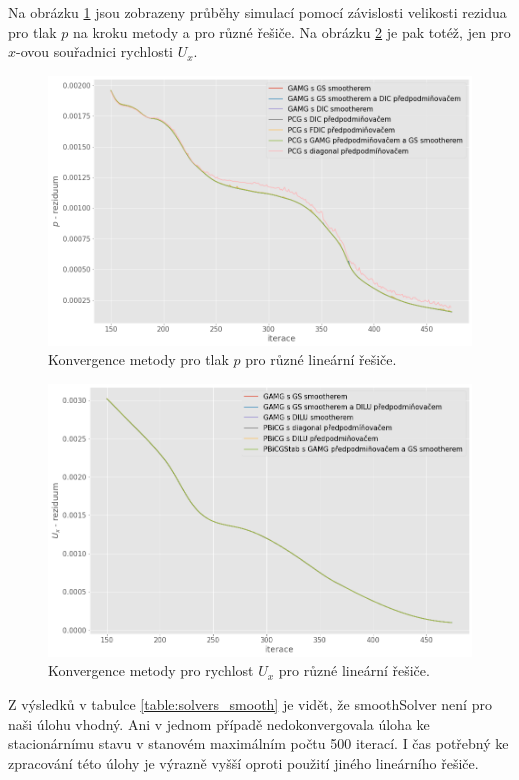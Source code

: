 \documentclass[a4paper,12pt]{report}
\theoremstyle{remark}
\begin{document}
Na obrázku \ref{fig:p-residuum} jsou zobrazeny průběhy simulací pomocí závislosti velikosti rezidua pro tlak $p$ na kroku metody a pro různé řešiče. Na obrázku \ref{fig:ux-residuum} je pak totéž, jen pro $x$-ovou souřadnici rychlosti $U_x$.
\begin{figure}[H]
	\centering
	\includegraphics[width=1\linewidth]{p-residuum.png}
	\caption{Konvergence metody pro tlak $p$ pro různé lineární řešiče.}
	\label{fig:p-residuum}
\end{figure}
\begin{figure}[H]
	\centering
	\includegraphics[width=1\linewidth]{ux-residuum.png}
	\caption{Konvergence metody pro rychlost $U_x$ pro různé lineární řešiče.}
	\label{fig:ux-residuum}
\end{figure}
Z výsledků v tabulce \ref{table:solvers_smooth} je vidět, že smoothSolver není pro naši úlohu vhodný. Ani v jednom případě nedokonvergovala úloha ke stacionárnímu stavu v stanovém maximálním počtu 500 iterací.  I čas potřebný ke zpracování této úlohy je výrazně vyšší oproti použití jiného lineárního řešiče. 
\end{document}
